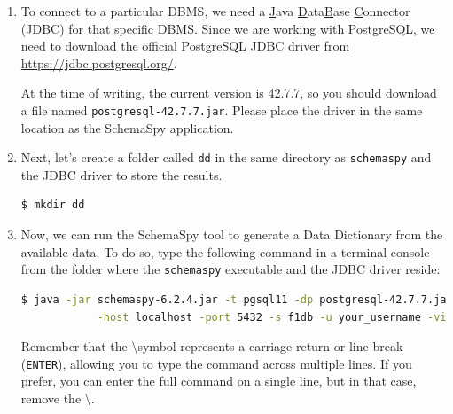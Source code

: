 \documentclass{article}
\begin{document}
\begin{enumerate}
    \begin{lstlisting}[language=bash]
    $ psql mrd
    \end{lstlisting}

    From the PostgreSQL prompt (once you are in the PostgreSQL environment), upload the dump file using the following command: \texttt{\textbackslash i \textit{path\_to\_dump\_file}}

    \begin{lstlisting}[language=bash]
    mrd=# \i dump_mrd.sql
    \end{lstlisting}

    You may need to adjust the full path of the file as necessary.

    \item To connect to a particular DBMS, we need a \underline{J}ava \underline{D}ata\underline{B}ase \underline{C}onnector (JDBC) for that specific DBMS. Since we are working with PostgreSQL, we need to download the official PostgreSQL JDBC driver from \url{https://jdbc.postgresql.org/}.

    At the time of writing, the current version is 42.7.7, so you should download a file named \texttt{postgresql-42.7.7.jar}. Please place the driver in the same location as the SchemaSpy application.

    \item Next, let's create a folder called \texttt{dd} in the same directory as \texttt{schemaspy} and the JDBC driver to store the results.

    \begin{lstlisting}[language=bash]
    $ mkdir dd
    \end{lstlisting}

    \item Now, we can run the SchemaSpy tool to generate a Data Dictionary from the available data. To do so, type the following command in a terminal console from the folder where the \texttt{schemaspy} executable and the JDBC driver reside:

    \begin{lstlisting}[language=bash]
    $ java -jar schemaspy-6.2.4.jar -t pgsql11 -dp postgresql-42.7.7.jar -db mrd \
            -host localhost -port 5432 -s f1db -u your_username -vizjs -o dd/
    \end{lstlisting}

    Remember that the \textbackslash symbol represents a carriage return or line break (\texttt{ENTER}), allowing you to type the command across multiple lines. If you prefer, you can enter the full command on a single line, but in that case, remove the \textbackslash.


\end{enumerate}
\end{document}
